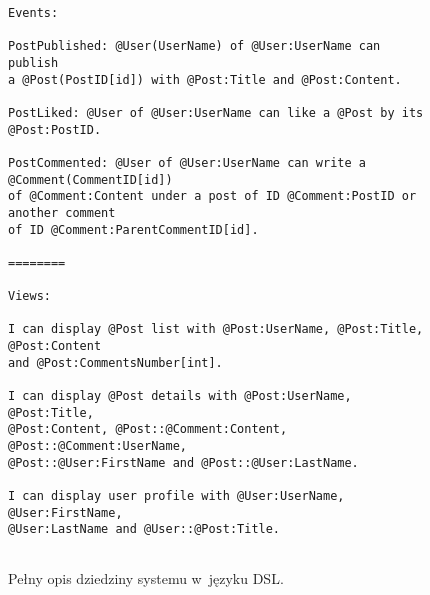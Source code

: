 \begin{figure}[!ht]
\begin{verbatim}
Events:

PostPublished: @User(UserName) of @User:UserName can publish
a @Post(PostID[id]) with @Post:Title and @Post:Content.

PostLiked: @User of @User:UserName can like a @Post by its @Post:PostID.

PostCommented: @User of @User:UserName can write a @Comment(CommentID[id])
of @Comment:Content under a post of ID @Comment:PostID or another comment
of ID @Comment:ParentCommentID[id].

========

Views:

I can display @Post list with @Post:UserName, @Post:Title, @Post:Content
and @Post:CommentsNumber[int].

I can display @Post details with @Post:UserName, @Post:Title,
@Post:Content, @Post::@Comment:Content, @Post::@Comment:UserName,
@Post::@User:FirstName and @Post::@User:LastName.

I can display user profile with @User:UserName, @User:FirstName,
@User:LastName and @User::@Post:Title.


\end{verbatim}
\caption{
 Pełny opis dziedziny systemu w~języku DSL.
}
\label{fig:single:model_dsl}
\end{figure}
